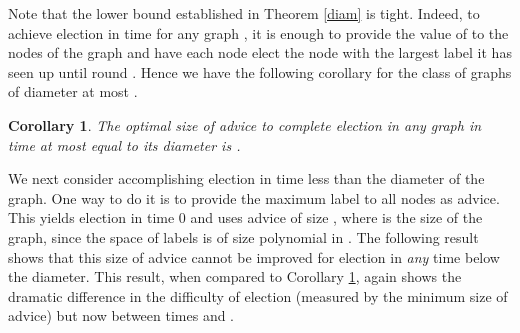 \documentclass[11pt]{article}
\newtheorem{corollary}{Corollary}[section]
\begin{document}
Note that the lower bound established in Theorem \ref{diam} is tight. Indeed, to achieve election in time  for any graph , it is enough to provide
the value of  to the nodes of the graph and have each node elect the node with the largest label it has seen up until round  .
Hence we have the following corollary for the class of graphs of diameter at most .

\begin{corollary}\label{cor1}
The optimal size of advice to complete election in any graph in time at most equal to its diameter is .
\end{corollary}

We next consider accomplishing election in time less than the diameter of the graph. One way to do it is to provide the maximum label to all nodes as advice. This yields 
election in time 0 and uses advice of size , where  is the size of the graph,  since the space of labels is of size  polynomial in .
The following result shows that this size of advice cannot be improved for election in {\em any} time below the diameter. This result, when compared to Corollary
\ref{cor1}, again shows the dramatic difference in the difficulty of election (measured by the minimum size of advice) but now between times  and . 
\end{document}
